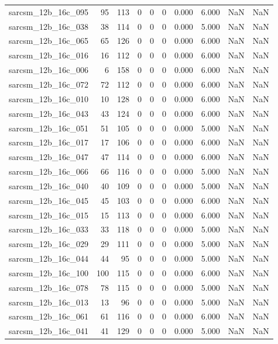 \documentclass{article}
\begin{document}
\begin{longtable}{lrrrrrrrrr}
sarcsm\_12b\_16c\_095 & 95 & 113 & 0 & 0 & 0 & 0.000 & 6.000 & NaN & NaN \\
sarcsm\_12b\_16c\_038 & 38 & 114 & 0 & 0 & 0 & 0.000 & 5.000 & NaN & NaN \\
sarcsm\_12b\_16c\_065 & 65 & 126 & 0 & 0 & 0 & 0.000 & 6.000 & NaN & NaN \\
sarcsm\_12b\_16c\_016 & 16 & 112 & 0 & 0 & 0 & 0.000 & 6.000 & NaN & NaN \\
sarcsm\_12b\_16c\_006 & 6 & 158 & 0 & 0 & 0 & 0.000 & 6.000 & NaN & NaN \\
sarcsm\_12b\_16c\_072 & 72 & 112 & 0 & 0 & 0 & 0.000 & 6.000 & NaN & NaN \\
sarcsm\_12b\_16c\_010 & 10 & 128 & 0 & 0 & 0 & 0.000 & 6.000 & NaN & NaN \\
sarcsm\_12b\_16c\_043 & 43 & 124 & 0 & 0 & 0 & 0.000 & 6.000 & NaN & NaN \\
sarcsm\_12b\_16c\_051 & 51 & 105 & 0 & 0 & 0 & 0.000 & 5.000 & NaN & NaN \\
sarcsm\_12b\_16c\_017 & 17 & 106 & 0 & 0 & 0 & 0.000 & 6.000 & NaN & NaN \\
sarcsm\_12b\_16c\_047 & 47 & 114 & 0 & 0 & 0 & 0.000 & 6.000 & NaN & NaN \\
sarcsm\_12b\_16c\_066 & 66 & 116 & 0 & 0 & 0 & 0.000 & 5.000 & NaN & NaN \\
sarcsm\_12b\_16c\_040 & 40 & 109 & 0 & 0 & 0 & 0.000 & 5.000 & NaN & NaN \\
sarcsm\_12b\_16c\_045 & 45 & 103 & 0 & 0 & 0 & 0.000 & 6.000 & NaN & NaN \\
sarcsm\_12b\_16c\_015 & 15 & 113 & 0 & 0 & 0 & 0.000 & 6.000 & NaN & NaN \\
sarcsm\_12b\_16c\_033 & 33 & 118 & 0 & 0 & 0 & 0.000 & 5.000 & NaN & NaN \\
sarcsm\_12b\_16c\_029 & 29 & 111 & 0 & 0 & 0 & 0.000 & 5.000 & NaN & NaN \\
sarcsm\_12b\_16c\_044 & 44 & 95 & 0 & 0 & 0 & 0.000 & 5.000 & NaN & NaN \\
sarcsm\_12b\_16c\_100 & 100 & 115 & 0 & 0 & 0 & 0.000 & 6.000 & NaN & NaN \\
sarcsm\_12b\_16c\_078 & 78 & 115 & 0 & 0 & 0 & 0.000 & 5.000 & NaN & NaN \\
sarcsm\_12b\_16c\_013 & 13 & 96 & 0 & 0 & 0 & 0.000 & 5.000 & NaN & NaN \\
sarcsm\_12b\_16c\_061 & 61 & 116 & 0 & 0 & 0 & 0.000 & 6.000 & NaN & NaN \\
sarcsm\_12b\_16c\_041 & 41 & 129 & 0 & 0 & 0 & 0.000 & 5.000 & NaN & NaN \\

\end{longtable}
\end{document}
